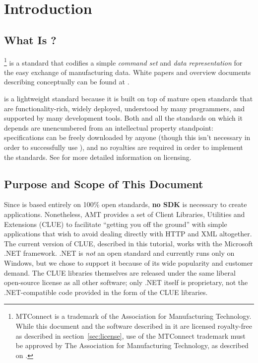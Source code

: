 \section{Introduction}

\subsection{What Is \mtc?}

\mtc\footnote{MTConnect is a trademark of the
  Association for Manufacturing Technology.  While this document and the
  software described in it are licensed  royalty-free as described in
  section~\ref{sec:license}, use of the MTConnect trademark must be
  approved by The Association for Manufacturing Technology, as described
  on \website.}
is a standard that codifies a simple  \emph{command
  set}  and \emph{data representation} for the easy exchange of
manufacturing data.  White papers and overview documents describing
\mtc{} conceptually can be found at \website.

\mtc{} is a lightweight standard because it is built on top of mature
open standards that are functionality-rich, widely deployed, understood
by many programmers, and supported by many development tools.
Both \mtc and all the standards on which it depends
are unencumbered from an intellectual property standpoint:
specifications can be freely downloaded by
anyone (though this isn't necessary in order to successfully use \mtc),
and no royalties are required in order to implement the standards.  See
\website{} for more detailed information on licensing.

\subsection{Purpose and Scope of This Document}

Since \mtc{} is based entirely on 100\% open standards, \textbf{no SDK}
is necessary to create \mtc{} applications.  Nonetheless, AMT provides a
set of Client Libraries, Utilities and Extensions (CLUE) to facilitate
``getting you off the ground'' with simple applications that wish to
avoid dealing directly with HTTP and XML altogether.  The current
version of CLUE, described in this tutorial, works with the Microsoft
.NET framework.  .NET is \emph{not} an open standard and
currently runs only on Windows, but we chose to support it because of
its wide popularity and customer demand.  The CLUE libraries themselves
are released under the same liberal open-source license as all other
\mtc{} software; only .NET itself is proprietary, not the
.NET-compatible code provided in the form of the CLUE libraries.


